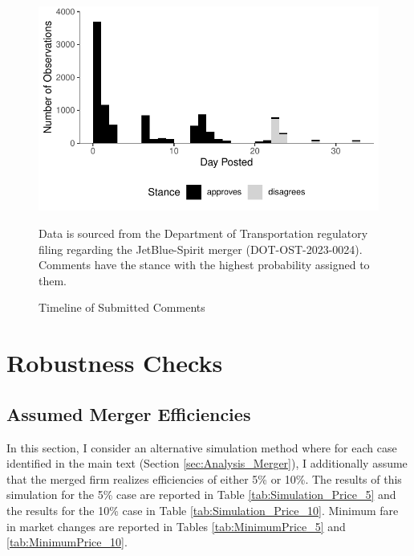 \documentclass{article}
\begin{document}
\begin{appendices}
    \begin{figure}[h]
		\caption{Timeline of Submitted Comments}
		\label{fig:CommentTimeline}
        \begin{center}
    	\includegraphics{stance_submission_timeline}
        \end{center}
		\begin{minipage}{\textwidth} 
			{\footnotesize Data is sourced from the Department of Transportation regulatory filing regarding the JetBlue-Spirit merger  (DOT-OST-2023-0024). Comments have the stance with the highest probability assigned to them.} 
		\end{minipage}
	\end{figure}
	    

    \pagebreak 

    \FloatBarrier
    \section{Robustness Checks}
    \setcounter{table}{0}
    \setcounter{figure}{0}
    \subsection{Assumed Merger Efficiencies}
    \label{App:Efficiencies}
    In this section, I consider an alternative simulation method where for each case identified in the main text (Section \ref{sec:Analysis_Merger}), I additionally assume that the merged firm realizes efficiencies of either 5\% or 10\%. The results of this simulation for the 5\% case are reported in Table \ref{tab:Simulation_Price_5} and the results for the 10\% case in Table \ref{tab:Simulation_Price_10}. Minimum fare in market changes are reported in Tables \ref{tab:MinimumPrice_5} and \ref{tab:MinimumPrice_10}. 


\end{appendices}
\end{document}
